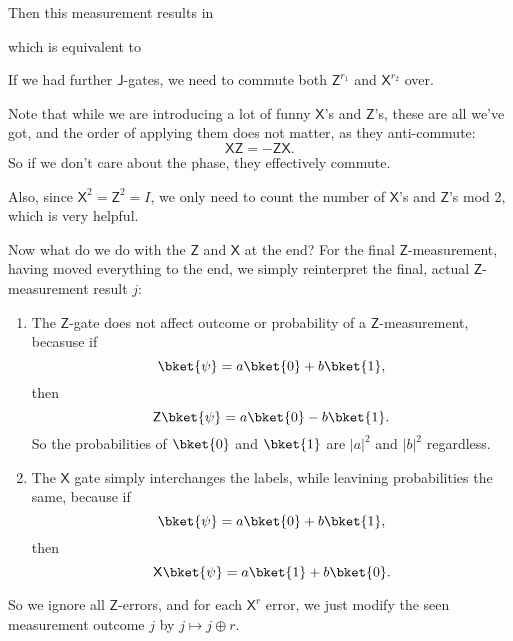 \documentclass[a4paper]{article}
\makeatletter
\newcommand\addMQCstate [3] {
  \pgfmathsetmacro{\x@x}{#3 * 1.5 - 1};
  \node [left] at (0, -#2) {#1};
  \draw (0, -#2) -- (\x@x, -#2);
}
\newcommand\addJ[3]{
  \pgfmathsetmacro{\x@x}{#3 * 1.5 - 0.5};
 \node [draw, rectangle, fill=morange!30!white, minimum height=0.65cm, minimum width=1cm] at (\x@x, -#2) {$\qJ(#1)$};
}
\newcommand\addX[3]{
  \pgfmathsetmacro{\x@x}{#3 * 1.5 - 0.5};
  \node [draw, rectangle, fill=mgreen!30!white, minimum height=0.65cm, minimum width=1cm] at (\x@x, -#2) {$\qX^{#1}$};
}
\newcommand\addZ[3]{
  \pgfmathsetmacro{\x@x}{#3 * 1.5 - 0.5};
  \node [draw, rectangle, fill=mblue!30!white, minimum height=0.65cm, minimum width=1cm] at (\x@x, -#2) {$\qZ^{#1}$};
}
\newcommand\measurestate[4] {
  \pgfmathsetmacro{\y@y}{-#3 - 0.05};
  \pgfmathsetmacro{\x@x}{#4 + 0.05};
  \draw [-latex'] (\x@x, \y@y) -- +(0.4, -0.4) node [right] {#2};
  \node [above] at (#4, -#3) {#1};
}
\newcommand{\qJ}{\mathsf{J}}
\newcommand{\qX}{\mathsf{X}}
\newcommand{\qZ}{\mathsf{Z}}
\makeatother
\begin{document}
\begin{eg}
\begin{center}
  \end{center}
  Then this measurement results in
  \begin{center}
  \end{center}
  which is equivalent to
  \begin{center}
  \end{center}
  If we had further $\qJ$-gates, we need to commute both $\qZ^{r_1}$ and $\qX^{r_2}$ over.

  Note that while we are introducing a lot of funny $\qX$'s and $\qZ$'s, these are all we've got, and the order of applying them does not matter, as they anti-commute:
  \[
    \qX\qZ = -\qZ\qX.
  \]
  So if we don't care about the phase, they effectively commute.

  Also, since $\qX^2 = \qZ^2 = I$, we only need to count the number of $\qX$'s and $\qZ$'s mod 2, which is very helpful.

  Now what do we do with the $\qZ$ and $\qX$ at the end? For the final $\qZ$-measurement, having moved everything to the end, we simply reinterpret the final, actual $\qZ$-measurement result $j$:
  \begin{enumerate}
    \item The $\qZ$-gate does not affect outcome or probability of a $\qZ$-measurement, becasuse if
      \[
        \bket{\psi} = a \bket{0} + b \bket{1},
      \]
      then
      \[
        \qZ \bket{\psi} = a \bket{0} - b \bket{1}.
      \]
      So the probabilities of $\bket{0}$ and $\bket{1}$ are $|a|^2$ and $|b|^2$ regardless.

    \item The $\qX$ gate simply interchanges the labels, while leavining probabilities the same, because if
      \[
        \bket{\psi} = a \bket{0} + b \bket{1},
      \]
      then
      \[
        \qX \bket{\psi} = a \bket{1} + b \bket{0}.
      \]
  \end{enumerate}
  So we ignore all $\qZ$-errors, and for each $\qX^r$ error, we just modify the seen measurement outcome $j$ by $j \mapsto j \oplus r$.
\end{eg}
\end{document}
